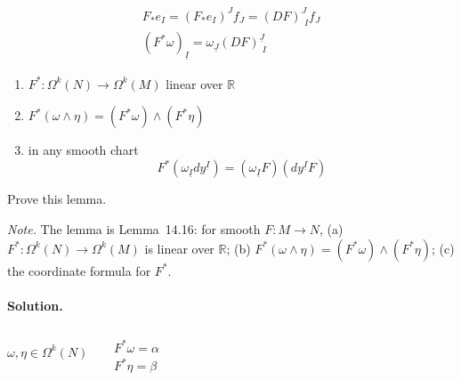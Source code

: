 \[
\begin{gathered}
  F_*e_I = (F_* e_I)^J f_J = (DF)^J_{ \, \, I } f_J \\ 
 (F^* \omega)_{\underline{I}} = \omega_{\underline{J}} (DF)^{\underline{J}}_{ \, \, I } 
\end{gathered}
\]



\begin{lemma}[14.16]
\begin{enumerate}
  \item[(a)] $F^* : \Omega^k(N) \to \Omega^k(M)$ linear over $\mathbb{R}$ 
\item[(b)] $F^*(\omega \wedge \eta) = (F^* \omega) \wedge (F^* \eta)$
\item[(c)] in any smooth chart 
\[
F^*( \omega_{\underline{I}} dy^{\underline{I}} ) = (\omega_{\underline{I}} F) ( dy^{ \underline{I}} F)
\]
\end{enumerate}
\end{lemma}



\begin{exercise}
Prove this lemma.
\end{exercise}
\noindent\emph{Note.} The lemma is Lemma~14.16: for smooth $F\colon M\to N$, (a) $F^*\colon\Omega^k(N)\to\Omega^k(M)$ is linear over $\mathbb{R}$; (b) $F^*(\omega\wedge\eta)=(F^*\omega)\wedge(F^*\eta)$; (c) the coordinate formula for $F^*$.
\paragraph{Solution.}

$\omega, \eta \in \Omega^k(N)$ \quad \quad \, $\begin{aligned} & \quad \\
  & F^* \omega = \alpha \\
  & F^* \eta = \beta \end{aligned}$


